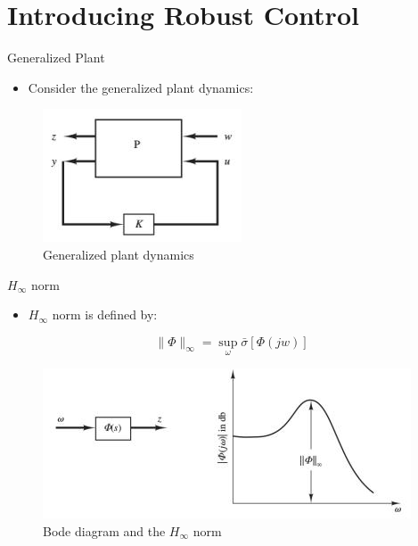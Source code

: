 \documentclass[handout]{beamer}
\begin{document}
\section{Introducing Robust Control}
%
\begin{frame}{Generalized Plant}
\begin{itemize}
\item Consider the generalized plant dynamics:
\end{itemize}
\begin{figure}
  \center
  \includegraphics[scale=1.0]{generalizedPlant.jpg}
  \caption{Generalized plant dynamics}			
\end{figure}
\end{frame}
%
\begin{frame}{$H_{\infty}$ norm}
\begin{itemize}
\item $H_{\infty}$ norm is defined by: 
\end{itemize}
\begin{equation}
\|\Phi\|_{\infty} = \sup_{\omega}\bar{\sigma}[\Phi(jw)]
\end{equation}
\begin{figure}
  \center
  \includegraphics[scale=1.0]{HInf.jpg}
  \caption{Bode diagram and the $H_{\infty}$ norm}			
\end{figure}
\end{frame}
%
\end{document}

